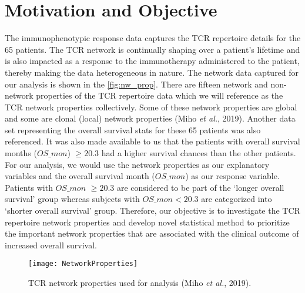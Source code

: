 \section{Motivation and Objective}\label{sec:motiv_objctv}
The immunophenotypic response data captures the TCR repertoire details for the 65 patients. The TCR network is continually shaping over a patient's lifetime and is also impacted as a response to the immunotherapy administered to the patient, thereby making the data heterogeneous in  nature. The network data captured for our analysis is shown in the \autoref{fig:nw_prop}. There are fifteen network and non-network properties of the TCR repertoire data which we will reference as the TCR network properties collectively. Some of these network properties are global and some are clonal (local) network properties (\cite{tcr_ntw}Miho \textit{et al.}, 2019). Another data set representing the overall survival stats for these 65 patients was also referenced. It was also made available to us that the patients with overall survival months ($OS\_mon$) $\ge 20.3$ had a higher survival chances than the other patients. For our analysis, we would use the network properties as our explanatory variables and the overall survival month ($OS\_mon$) as our response variable. Patients with $OS\_mon$ $\ge 20.3$ are considered to be part of the \lq longer overall survival' group whereas subjects with $OS\_mon<20.3$ are categorized into \lq shorter overall survival' group. Therefore, our objective is to investigate the TCR repertoire network properties and develop novel statistical method to prioritize the important network properties that are associated with the clinical outcome of increased overall survival.\par
\begin{figure}[H]
\centering
\texttt{[image: NetworkProperties]}
\caption{TCR network properties used for analysis (\cite{tcr_ntw}Miho \textit{et al.}, 2019).}
\label{fig:nw_prop}
\end{figure}

